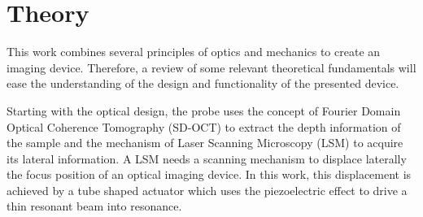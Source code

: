 
\chapter{Theory}
\label{Ch:Theory}	

This work combines several principles of optics and mechanics to create an imaging device. Therefore, a review of some relevant theoretical fundamentals will ease the understanding of the design and functionality of the presented device.

Starting with the optical design, the probe uses the concept of Fourier Domain Optical Coherence Tomography (SD-OCT) to extract the depth information of the sample and the mechanism of Laser Scanning Microscopy (LSM) to acquire its lateral information. A LSM needs a scanning mechanism to displace laterally the focus position of an optical imaging device. In this work, this displacement is achieved by a tube shaped actuator which uses the piezoelectric effect to drive a thin resonant beam into resonance.

